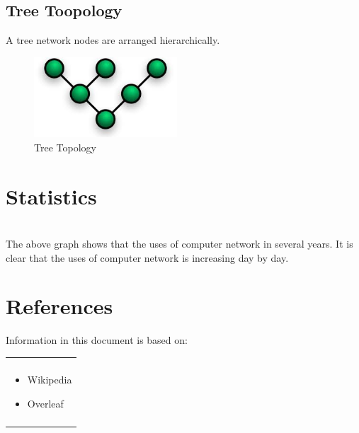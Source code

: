 \documentclass{article}
\newenvironment{boxed}
    {\begin{center}
    \begin{tabular}{|p{0.9\textwidth}|}
    \hline\\
    }
    { 
    \\\\\hline
    \end{tabular} 
    \end{center}
    }
\begin{document}
\subsection{Tree Toopology}
A tree network nodes are arranged hierarchically.
\begin{figure}[h]
\includegraphics[width=0.9\linewidth, height=3cm]{tree.jpg}
\caption*{Tree Topology}
\end{figure}
\newpage
\section{Statistics} 
\\The above graph shows that the uses of computer network in several years. It is clear that the uses of computer network is increasing day by day.
 \section{References}
Information in this document is based on:
\begin{boxed}
\begin{itemize}
\item Wikipedia
\item Overleaf
\end{itemize} 
\end{boxed}
\end{document}

